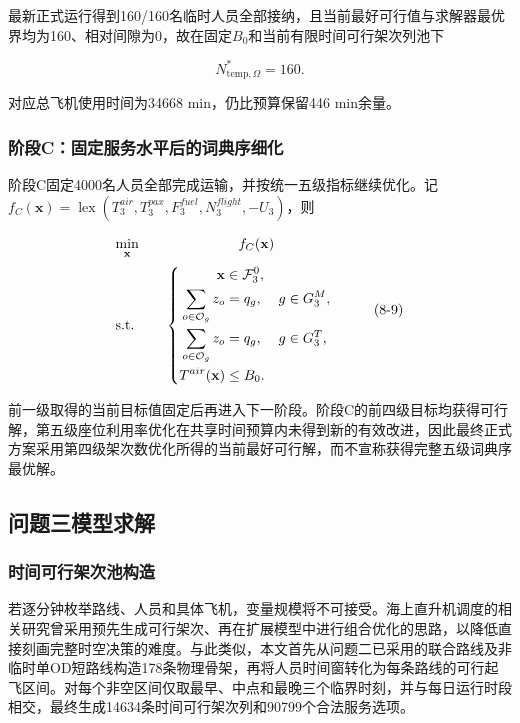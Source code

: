 最新正式运行得到160/160名临时人员全部接纳，且当前最好可行值与求解器最优界均为160、相对间隙为0，故在固定$B_0$和当前有限时间可行架次列池下

\[
N_{\mathrm{temp},\Omega}^{*}=160.
\tag{8-8}\label{eq:q3-temp-optimum}
\]

对应总飞机使用时间为34668 min，仍比预算保留446 min余量。

\subsubsection{阶段C：固定服务水平后的词典序细化}

阶段C固定4000名人员全部完成运输，并按统一五级指标继续优化。记
$f_C(\mathbf{x})=\operatorname{lex}
(T_3^{air},T_3^{pax},F_3^{fuel},N_3^{flight},-U_3)$，则

\[
\begin{array}{@{}l@{\qquad}c@{}}
\displaystyle \min_{\mathbf{x}}
&
\displaystyle f_C(\mathbf{x})
\\[1.0em]
\mathrm{s.t.}
&
\left\{
\begin{aligned}
\mathbf{x}&\in\mathcal F_3^0,\\
\sum_{o\in\mathcal O_g}z_o&=q_g,
&&g\in G_3^M,\\
\sum_{o\in\mathcal O_g}z_o&=q_g,
&&g\in G_3^T,\\
T^{air}(\mathbf{x})&\le B_0.
\end{aligned}
\right.
\end{array}
\tag{8-9}\label{eq:q3-stage-c}
\]

前一级取得的当前目标值固定后再进入下一阶段。阶段C的前四级目标均获得可行解，第五级座位利用率优化在共享时间预算内未得到新的有效改进，因此最终正式方案采用第四级架次数优化所得的当前最好可行解，而不宣称获得完整五级词典序最优解。

\subsection{问题三模型求解}\label{subsec:q3-solution}

\subsubsection{时间可行架次池构造}

若逐分钟枚举路线、人员和具体飞机，变量规模将不可接受。海上直升机调度的相关研究曾采用预先生成可行架次、再在扩展模型中进行组合优化的思路，以降低直接刻画完整时空决策的难度\cite{nafstad2021}。与此类似，本文首先从问题二已采用的联合路线及非临时单OD短路线构造178条物理骨架，再将人员时间窗转化为每条路线的可行起飞区间。对每个非空区间仅取最早、中点和最晚三个临界时刻，并与每日运行时段相交，最终生成14634条时间可行架次列和90799个合法服务选项。

